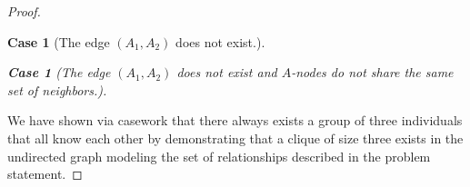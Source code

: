 \documentclass{article}
\newtheorem{case}{Case}
\newtheorem{subcase}{Case}
\numberwithin{subcase}{case}
\begin{document}
\begin{proof}
\begin{case}[The edge $(A_{1}, A_{2})$ does not exist.]
\begin{subcase}[The edge $(A_{1}, A_{2})$ does not exist and $A$-nodes do not share the same set of neighbors.]
\end{subcase}

\end{case}

We have shown via casework that there always exists a group of three individuals that all know each other by demonstrating that a clique of size three exists in the undirected graph modeling the set of relationships described in the problem statement.

\end{proof}
\end{document}
